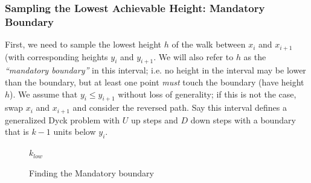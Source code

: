 \subsubsection{Sampling the Lowest Achievable Height: Mandatory Boundary}
\label{sec:sampling_the_lowest_achievable_height}
First, we need to sample the lowest height $h$ of the walk between $x_i$ and $x_{i+1}$ (with corresponding heights $y_i$ and $y_{i+1}$.
We will also refer to $h$ as the \emph{``mandatory boundary''} in this interval;
i.e. no height in the interval may be lower than the boundary, but at least one point \emph{must} touch the boundary (have height $h$).
We assume that $y_i\le y_{i+1}$ without loss of generality; if this is not the case, swap $x_i$ and $x_{i+1}$ and consider the reversed path.
Say this interval defines a generalized Dyck problem with $U$ up steps and $D$ down steps with a boundary that is $k-1$ units below $y_i$.
\begin{figure}
\vspace{-3.0em}
\begin{framed}
    \renewcommand\figurename{Algorithm}
    \caption{Finding the Mandatory boundary}
    \label{alg:mandatory_boundary}
    \begin{algorithmic}[1]
                \vspace{.3em}
                \vspace{.3em}
                \vspace{.3em}
                \vspace{.3em}
            \EndWhile
            \State \Return $k_{low}$
        \EndFunction
    \end{algorithmic}
\end{framed}
\end{figure}

